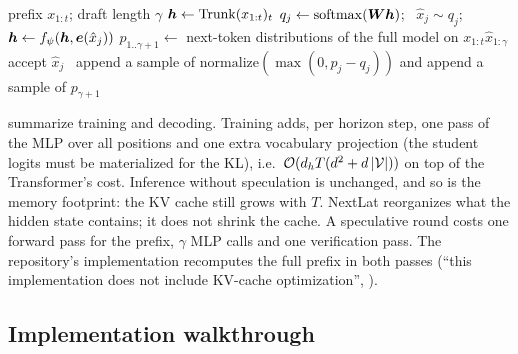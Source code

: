 \begin{algorithm}[t]
\caption{NextLat self-speculative decoding (one round)}\label{alg:c08-nextlat-spec}
\begin{algorithmic}[1]
\Require prefix $x_{1:t}$; draft length $\gamma$
\State $\bm{h}\gets\mathrm{Trunk}(x_{1:t})_t$ 
  \State $q_j\gets\operatorname{softmax}(\bm{W}\bm{h})$; \ $\hat x_j\sim q_j$; \ $\bm{h}\gets f_\psi(\bm{h},\bm{e}(\hat x_j))$ 
\EndFor
\State $p_{1..\gamma+1}\gets$ next-token distributions of the full model on $x_{1:t}\hat x_{1:\gamma}$ 
   accept $\hat x_j$
  \Else\ append a sample of $\mathrm{normalize}(\max(0,p_j-q_j))$ and \Return
  \EndIf
\EndFor
\State append a sample of $p_{\gamma+1}$
\end{algorithmic}
\end{algorithm}

 summarize training and decoding. Training adds,
per horizon step, one pass of the MLP over all positions and one extra vocabulary projection (the
student logits must be materialized for the KL), i.e.\ $\mathcal{O}(d_hT(d^2+d\left\lvert \mathcal{V}\right\rvert))$ on top of
the Transformer's cost. Inference without speculation is unchanged, and so is the memory footprint:
the KV cache still grows with $T$. NextLat reorganizes what the hidden state contains; it does not
shrink the cache. A speculative round costs one forward pass for the prefix, $\gamma$ MLP calls and
one verification pass. The repository's implementation recomputes the full prefix in both passes
(``this implementation does not include KV-cache optimization'',
).

\subsection{Implementation walkthrough}

